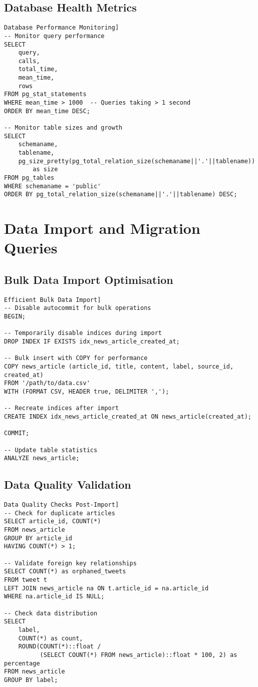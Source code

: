 \documentclass[11pt,a4paper]{article}
\begin{document}
\subsection{Database Health Metrics}
\begin{verbatim}Database Performance Monitoring]
-- Monitor query performance
SELECT 
    query,
    calls,
    total_time,
    mean_time,
    rows
FROM pg_stat_statements
WHERE mean_time > 1000  -- Queries taking > 1 second
ORDER BY mean_time DESC;

-- Monitor table sizes and growth
SELECT 
    schemaname,
    tablename,
    pg_size_pretty(pg_total_relation_size(schemaname||'.'||tablename)) 
        as size
FROM pg_tables
WHERE schemaname = 'public'
ORDER BY pg_total_relation_size(schemaname||'.'||tablename) DESC;
\end{verbatim}

\section{Data Import and Migration Queries}

\subsection{Bulk Data Import Optimisation}
\begin{verbatim}Efficient Bulk Data Import]
-- Disable autocommit for bulk operations
BEGIN;

-- Temporarily disable indices during import
DROP INDEX IF EXISTS idx_news_article_created_at;

-- Bulk insert with COPY for performance
COPY news_article (article_id, title, content, label, source_id, created_at)
FROM '/path/to/data.csv'
WITH (FORMAT CSV, HEADER true, DELIMITER ',');

-- Recreate indices after import
CREATE INDEX idx_news_article_created_at ON news_article(created_at);

COMMIT;

-- Update table statistics
ANALYZE news_article;
\end{verbatim}

\subsection{Data Quality Validation}
\begin{verbatim}Data Quality Checks Post-Import]
-- Check for duplicate articles
SELECT article_id, COUNT(*) 
FROM news_article 
GROUP BY article_id 
HAVING COUNT(*) > 1;

-- Validate foreign key relationships
SELECT COUNT(*) as orphaned_tweets
FROM tweet t
LEFT JOIN news_article na ON t.article_id = na.article_id
WHERE na.article_id IS NULL;

-- Check data distribution
SELECT 
    label,
    COUNT(*) as count,
    ROUND(COUNT(*)::float / 
          (SELECT COUNT(*) FROM news_article)::float * 100, 2) as percentage
FROM news_article
GROUP BY label;
\end{verbatim}
\end{document}
